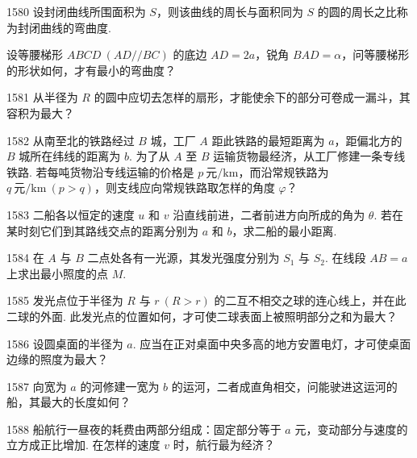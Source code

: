 \begin{prob}[M]{1580}
设封闭曲线所围面积为 $S$，则该曲线的周长与面积同为 $S$ 的圆的周长之比称为封闭曲线的弯曲度.

设等腰梯形 $ABCD\ (AD // BC)$ 的底边 $AD = 2a$，锐角 $BAD = \alpha$，问等腰梯形的形状如何，才有最小的弯曲度？
\end{prob}

\begin{prob}[M]{1581}
从半径为 $R$ 的圆中应切去怎样的扇形，才能使余下的部分可卷成一漏斗，其容积为最大？
\end{prob}

\begin{prob}[M]{1582}
从南至北的铁路经过 $B$ 城，工厂 $A$ 距此铁路的最短距离为 $a$，距偏北方的 $B$ 城所在纬线的距离为 $b$. 为了从 $A$ 至 $B$ 运输货物最经济，从工厂修建一条专线铁路. 若每吨货物沿专线运输的价格是 $p\ \text{元/km}$，而沿常规铁路为 $q\ \text{元/km}\ (p > q)$，则支线应向常规铁路取怎样的角度 $\varphi$？
\end{prob}

\begin{prob}[M]{1583}
二船各以恒定的速度 $u$ 和 $v$ 沿直线前进，二者前进方向所成的角为 $\theta$. 若在某时刻它们到其路线交点的距离分别为 $a$ 和 $b$，求二船的最小距离.
\end{prob}

\begin{prob}[M]{1584}
在 $A$ 与 $B$ 二点处各有一光源，其发光强度分别为 $S_1$ 与 $S_2$. 在线段 $AB = a$ 上求出最小照度的点 $M$.
\end{prob}

\begin{prob}[M]{1585}
发光点位于半径为 $R$ 与 $r\ (R > r)$ 的二互不相交之球的连心线上，并在此二球的外面. 此发光点的位置如何，才可使二球表面上被照明部分之和为最大？
\end{prob}

\begin{prob}[M]{1586}
设圆桌面的半径为 $a$. 应当在正对桌面中央多高的地方安置电灯，才可使桌面边缘的照度为最大？
\end{prob}

\begin{prob}[M]{1587}
向宽为 $a$ 的河修建一宽为 $b$ 的运河，二者成直角相交，问能驶进这运河的船，其最大的长度如何？
\end{prob}

\begin{prob}[M]{1588}
船航行一昼夜的耗费由两部分组成：固定部分等于 $a$ 元，变动部分与速度的立方成正比增加. 在怎样的速度 $v$ 时，航行最为经济？
\end{prob}


